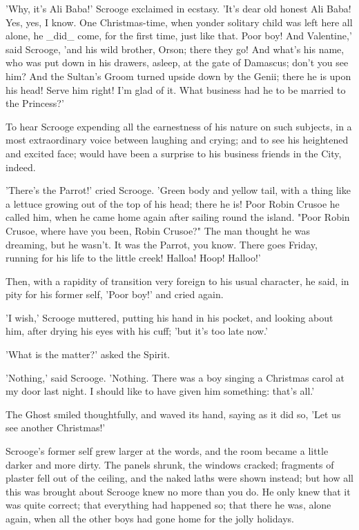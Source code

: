 'Why, it's Ali Baba!' Scrooge exclaimed in ecstasy. 'It's dear old
honest Ali Baba! Yes, yes, I know. One Christmas-time, when yonder
solitary child was left here all alone, he _did_ come, for the first
time, just like that. Poor boy! And Valentine,' said Scrooge, 'and his
wild brother, Orson; there they go! And what's his name, who was put
down in his drawers, asleep, at the gate of Damascus; don't you see him?
And the Sultan's Groom turned upside down by the Genii; there he is upon
his head! Serve him right! I'm glad of it. What business had he to be
married to the Princess?'

To hear Scrooge expending all the earnestness of his nature on such
subjects, in a most extraordinary voice between laughing and crying; and
to see his heightened and excited face; would have been a surprise to
his business friends in the City, indeed.

'There's the Parrot!' cried Scrooge. 'Green body and yellow tail, with a
thing like a lettuce growing out of the top of his head; there he is!
Poor Robin Crusoe he called him, when he came home again after sailing
round the island. "Poor Robin Crusoe, where have you been, Robin
Crusoe?" The man thought he was dreaming, but he wasn't. It was the
Parrot, you know. There goes Friday, running for his life to the little
creek! Halloa! Hoop! Halloo!'

Then, with a rapidity of transition very foreign to his usual character,
he said, in pity for his former self, 'Poor boy!' and cried again.

'I wish,' Scrooge muttered, putting his hand in his pocket, and looking
about him, after drying his eyes with his cuff; 'but it's too late now.'

'What is the matter?' asked the Spirit.

'Nothing,' said Scrooge. 'Nothing. There was a boy singing a Christmas
carol at my door last night. I should like to have given him something:
that's all.'

The Ghost smiled thoughtfully, and waved its hand, saying as it did so,
'Let us see another Christmas!'

Scrooge's former self grew larger at the words, and the room became a
little darker and more dirty. The panels shrunk, the windows cracked;
fragments of plaster fell out of the ceiling, and the naked laths were
shown instead; but how all this was brought about Scrooge knew no more
than you do. He only knew that it was quite correct; that everything had
happened so; that there he was, alone again, when all the other boys had
gone home for the jolly holidays.


